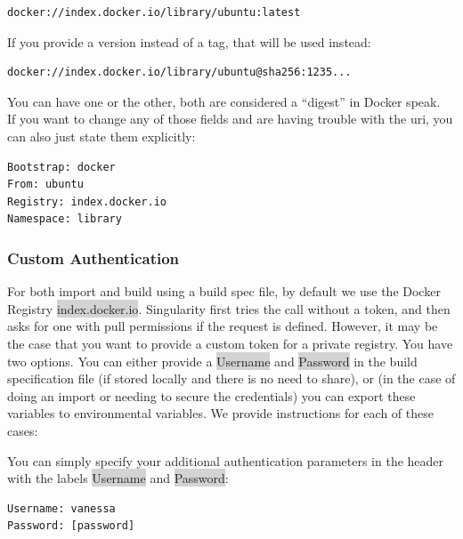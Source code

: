 \documentclass[a4paper]{article}
\newcounter{subsubsubsection}[subsubsection]
\begin{document}
\begin{lstlisting}[frame=single]
docker://index.docker.io/library/ubuntu:latest
\end{lstlisting}

If you provide a version instead of a tag, that will be used instead:

\begin{lstlisting}[frame=single]
docker://index.docker.io/library/ubuntu@sha256:1235...
\end{lstlisting}


You can have one or the other, both are considered a “digest” in Docker speak.\\[0.1in]

If you want to change any of those fields and are having trouble with the uri, you can also just state them explicitly:

\begin{lstlisting}[frame=single]
Bootstrap: docker
From: ubuntu
Registry: index.docker.io
Namespace: library
\end{lstlisting}

\subsubsection{Custom Authentication}

For both import and build using a build spec file, by default we use the Docker Registry \colorbox{lightgray}{index.docker.io}. Singularity first tries the call without a token, and then asks for one with pull permissions if the request is defined. However, it may be the case that you want to provide a custom token for a private registry. You have two options. You can either provide a \colorbox{lightgray}{Username} and \colorbox{lightgray}{Password} in the build specification file (if stored locally and there is no need to share), or (in the case of doing an import or needing to secure the credentials) you can export these variables to environmental variables. We provide instructions for each of these cases:\\[0.1in]

	
	You can simply specify your additional authentication parameters in the header with the labels \colorbox{lightgray}{Username} and \colorbox{lightgray}{Password}:
	
	
\begin{lstlisting}[frame=single]
Username: vanessa
Password: [password]
\end{lstlisting}
\end{document}
